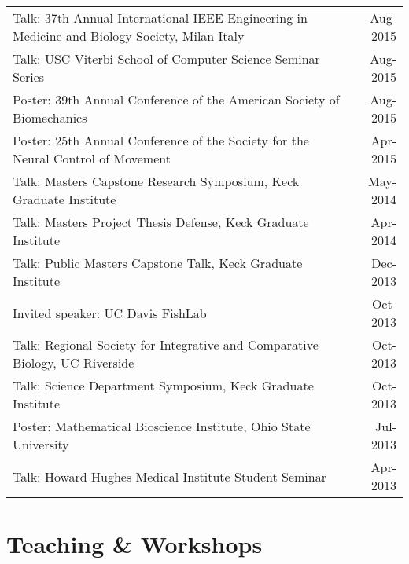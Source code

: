 \documentclass[10pt,a4paper]{article}
\begin{document}
\begin{tabularx}{17cm}{X r}
    Talk: 37th Annual International IEEE Engineering in Medicine and Biology Society, Milan Italy & Aug-2015 \\
    Talk: USC Viterbi School of Computer Science Seminar Series & Aug-2015 \\
    Poster: 39th Annual Conference of the American Society of Biomechanics & Aug-2015 \\
    Poster: 25th Annual Conference of the Society for the Neural Control of Movement & Apr-2015 \\
    Talk: Masters Capstone Research Symposium, Keck Graduate Institute & May-2014 \\
    Talk: Masters Project Thesis Defense, Keck Graduate Institute & Apr-2014 \\
    Talk: Public Masters Capstone Talk, Keck Graduate Institute & Dec-2013 \\
    Invited speaker: UC Davis FishLab & Oct-2013 \\
    Talk: Regional Society for Integrative and Comparative Biology, UC Riverside & Oct-2013 \\
    Talk: Science Department Symposium, Keck Graduate Institute & Oct-2013 \\
    Poster: Mathematical Bioscience Institute, Ohio State University & Jul-2013\\
    Talk: Howard Hughes Medical Institute Student Seminar & Apr-2013 \\
  \end{tabularx}

  \vspace*{2mm}\section*{Teaching \& Workshops}
\end{document}
